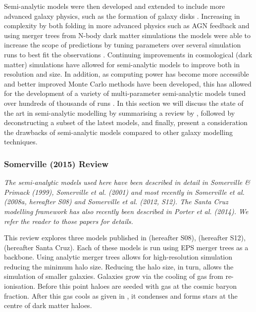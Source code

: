 
Semi-analytic models were then developed and extended to include more advanced galaxy physics, such as the formation of galaxy disks \citep{Mo1998TheDiscs}. Increasing in complexity by both folding in more advanced physics such as AGN feedback and using merger trees from N-body dark matter simulations the models were able to increase the scope of predictions by tuning parameters over several simulation runs to best fit the observations \citep{Bower2006BreakingFormation}. Continuing improvements in cosmological (dark matter) simulations have allowed for semi-analytic models to improve both in resolution and size. In addition, as computing power has become more accessible and better improved Monte Carlo methods have been developed, this has allowed for the development of a variety of multi-parameter semi-analytic models tuned over hundreds of thousands of runs \citep{Guo2011FromCosmology,DeLucia2011TimesCosmology,Fontanot2011TheUniverse,Menci2014TriggeringInteractions,Somerville2015StarGas}.
In this section we will discuss the state of the art in semi-analytic modelling by summarising a review by \citet{Somerville2015StarGas}, followed by deconstructing a subset of the latest models, and finally, present a consideration the drawbacks of semi-analytic models compared to other galaxy modelling techniques.

\subsubsection{Somerville (2015) Review \citep{Somerville2015StarGas}}
\textit{The semi-analytic models used here have been described in detail in Somerville \& Primack (1999), Somerville et al. (2001) and most recently in Somerville et al. (2008a, hereafter S08) and Somerville et al. (2012, S12). The Santa Cruz modelling framework has also recently been described in Porter et al. (2014). We refer the reader to those papers for details.}

This review explores three models published in \citet{Somerville2008ANuclei} (hereafter S08), \citet{Somerville2012GalaxyObservations} (hereafter S12), \citet{Porter2014ModellingSpace} (hereafter Santa Cruz). Each of these models is run using EPS merger trees as a backbone. Using analytic merger trees allows for high-resolution simulation reducing the minimum halo size. Reducing the halo size, in turn, allows the simulation of smaller galaxies. Galaxies grow via the cooling of gas from re-ionisation. Before this point haloes are seeded with gas at the cosmic baryon fraction. After this gas cools as given in \cite{White1991GalaxyClustering}, it condenses and forms stars at the centre of dark matter haloes. 

